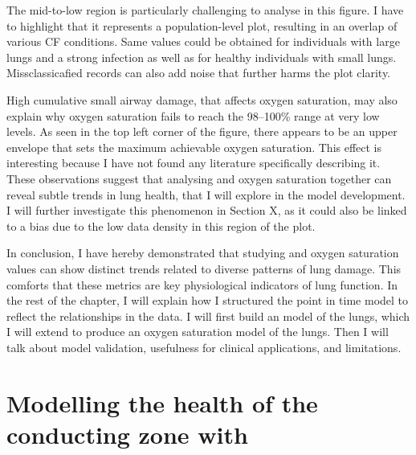 The mid-to-low \F region is particularly challenging to analyse in this figure. I have to highlight that it represents a population-level plot, resulting in an overlap of various CF conditions. Same \F values could be obtained for individuals with large lungs and a strong infection as well as for healthy individuals with small lungs. Missclassicafied records can also add noise that further harms the plot clarity.


High cumulative small airway damage, that affects oxygen saturation, may also explain why oxygen saturation fails to reach the 98–100\% range at very low \F levels. As  seen in the top left corner of the figure, there appears to be an upper envelope that sets the maximum achievable oxygen saturation. This effect is interesting because I have not found any literature specifically describing it. These observations suggest that analysing \F and oxygen saturation together can reveal subtle trends in lung health, that I will explore in the model development. I will further investigate this phenomenon in Section X, as it could also be linked to a bias due to the low data density in this region of the plot.

In conclusion, I have hereby demonstrated that studying \F and oxygen saturation values can show distinct trends related to diverse patterns of lung damage. This comforts that these metrics are key physiological indicators of lung function. In the rest of the chapter, I will explain how I structured the point in time model to reflect the relationships in the data. I will first build an \F model of the lungs, which I will extend to produce an oxygen saturation model of the lungs. Then I will talk about model validation, usefulness for clinical applications, and limitations.

\section{Modelling the health of the conducting zone with \F}

